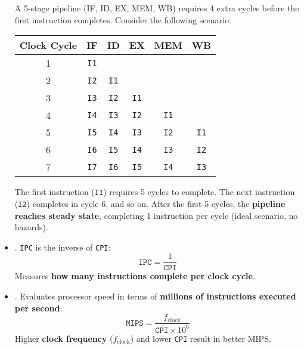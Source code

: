 \begin{itemize}
   \begin{examplebox}
      A 5-stage pipeline (IF, ID, EX, MEM, WB) requires 4 extra cycles before the first instruction completes. Consider the following scenario:
      \begin{center}
         \begin{tabular}{@{} c | c | c | c | c | c @{}}
            \toprule
            Clock Cycle & IF & ID & EX & MEM & WB \\
            \midrule
            1 & \texttt{I1} &    &    &    &    \\ [.3em]
            2 & \texttt{I2} & \texttt{I1} &    &    &    \\ [.3em]
            3 & \texttt{I3} & \texttt{I2} & \texttt{I1} &    &    \\ [.3em]
            4 & \texttt{I4} & \texttt{I3} & \texttt{I2} & \texttt{I1} &    \\ [.3em]
            5 & \texttt{I5} & \texttt{I4} & \texttt{I3} & \texttt{I2} & \texttt{I1} \\ [.3em]
            6 & \texttt{I6} & \texttt{I5} & \texttt{I4} & \texttt{I3} & \texttt{I2} \\ [.3em]
            7 & \texttt{I7} & \texttt{I6} & \texttt{I5} & \texttt{I4} & \texttt{I3} \\
            \bottomrule
         \end{tabular}
      \end{center}
      The first instruction (\texttt{I1}) requires 5 cycles to complete. The next instruction (\texttt{I2}) completes in cycle 6, and so on. After the first 5 cycles, the \textbf{pipeline reaches steady state}, completing 1 instruction per cycle (ideal scenario, no hazards).
   \end{examplebox}

   \item {}. \texttt{IPC} is the inverse of \texttt{CPI}:
   \begin{equation}
      \texttt{IPC} = \dfrac{1}{\texttt{CPI}}
   \end{equation}
   Measures \textbf{how many instructions complete per clock cycle}.

   \item {}. Evaluates processor speed in terms of \textbf{millions of instructions executed per second}:
   \begin{equation}
      \texttt{MIPS} = \dfrac{
         f_{\text{clock}}
      }{
         \texttt{CPI} \times 10^{6}
      }
   \end{equation}
   Higher \textbf{clock frequency} ($f_{\text{clock}}$) and lower \texttt{CPI} result in better MIPS.
\end{itemize}

